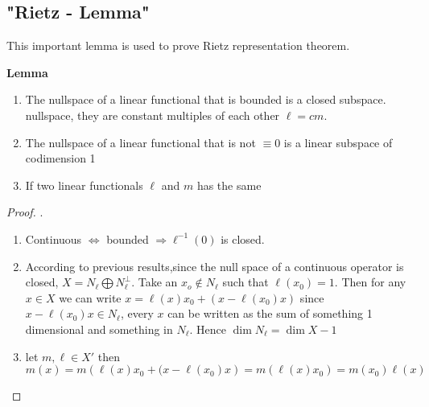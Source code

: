 \documentclass[titlepage]{article}
\begin{document}
\subsection{"Rietz - Lemma"}
This important lemma is used to prove Rietz representation theorem.

\textbf{Lemma}
\begin{enumerate}
\item The nullspace of a linear functional that is bounded is a closed subspace.
nullspace, they are constant multiples of each other $\ell = cm$.
\item The nullspace of a linear functional that is not $\equiv 0$ is a linear subspace of codimension 1
\item If two linear functionals $\ell$ and $m$ has the same 
\end{enumerate}
\begin{proof}
.

\begin{enumerate}
\item  Continuous $\Longleftrightarrow$ bounded $\Longrightarrow \ell ^{-1}(0)$ is closed.
\item According to previous results,since the null space of a continuous operator is closed, $X = N_\ell\bigoplus N_\ell^\perp$.
Take an $x_o\not\in N_\ell$ such that $\ell(x_0) = 1$.
Then for any $x\in X$ we can write $x = \ell(x)x_0 + (x - \ell(x_0)x)$
since $x - \ell(x_0)x \in  N_\ell$, every $x$ can be written as the sum of something 1 dimensional and something in $N_\ell$. Hence $\dim N_\ell = \dim X - 1$ 

\item let $m,\ell \in X'$ then $m(x) = m\left(\ell(x)x_0 + (x - \ell(x_0)x\right) = m(\ell(x)x_0) = m(x_0)\ell(x)$
\end{enumerate}




\end{proof}
\end{document}
